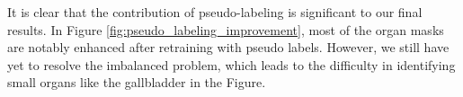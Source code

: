 It is clear that the contribution of pseudo-labeling is significant to our final results. In Figure \ref{fig:pseudo_labeling_improvement}, most of the organ masks are notably enhanced after retraining with pseudo labels. However, we still have yet to resolve the imbalanced problem, which leads to the difficulty in identifying small organs like the gallbladder in the Figure. 